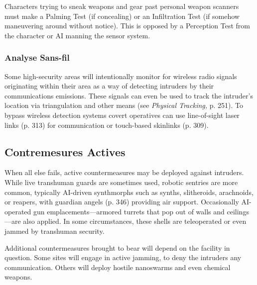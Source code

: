 Characters trying to sneak weapons and gear past personal weapon scanners must make a Palming Test (if concealing) or an Infiltration Test (if somehow maneuvering around without notice). This is opposed by a Perception Test from the character or AI manning the sensor system. 

\subsubsection{Analyse Sans-fil} 

Some high-security areas will intentionally monitor for wireless radio signals originating within their area as a way of detecting intruders by their communications emissions. These signals can even be used to track the intruder's location via triangulation and other means (see \textit{Physical Tracking,} p. 251). To bypass wireless detection systems covert operatives can use line-of-sight laser links (p. 313) for communication or touch-based skinlinks (p. 309). 

\subsection{Contremesures Actives} 

When all else fails, active countermeasures may be deployed against intruders. While live transhuman guards are sometimes used, robotic sentries are more common, typically AI-driven synthmorphs such as synths, slitheroids, arachnoids, or reapers, with guardian angels (p. 346) providing air support. Occasionally AI-operated gun emplacements—armored turrets that pop out of walls and ceilings—are also applied. In some circumstances, these shells are teleoperated or even jammed by transhuman security. 

Additional countermeasures brought to bear will depend on the facility in question. Some sites will engage in active jamming, to deny the intruders any communication. Others will deploy hostile nanoswarms and even chemical weapons. 